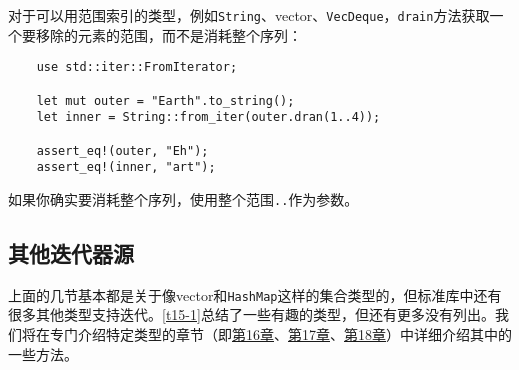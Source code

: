 对于可以用范围索引的类型，例如\texttt{String}、vector、\texttt{VecDeque}，\texttt{drain}方法获取一个要移除的元素的范围，而不是消耗整个序列：
\begin{verbatim}
    use std::iter::FromIterator;

    let mut outer = "Earth".to_string();
    let inner = String::from_iter(outer.dran(1..4));

    assert_eq!(outer, "Eh");
    assert_eq!(inner, "art");
\end{verbatim}

如果你确实要消耗整个序列，使用整个范围\texttt{..}作为参数。

\subsection{其他迭代器源}
上面的几节基本都是关于像vector和\texttt{HashMap}这样的集合类型的，但标准库中还有很多其他类型支持迭代。\autoref{t15-1}总结了一些有趣的类型，但还有更多没有列出。我们将在专门介绍特定类型的章节（即\hyperref[ch16]{第16章}、\hyperref[ch17]{第17章}、\hyperref[ch18]{第18章}）中详细介绍其中的一些方法。

